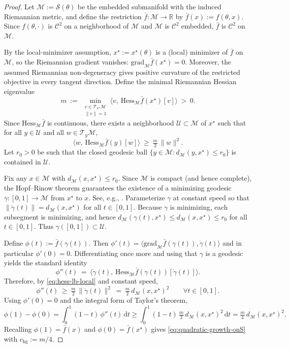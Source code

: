 \documentclass{article}
\theoremstyle{normaltheorem}
\newcommand{\ud}{\mathrm{d}}
\newcommand{\R}{\mathbb{R}}
\newcommand{\calS}{\mathcal{S}}
\begin{document}
\begin{proof}
Let $\mathcal M:=\calS(\theta)$ be the embedded submanifold with the induced Riemannian metric, and define the restriction
$\bar f:\mathcal M\to\R$ by $\bar f(x):=f(\theta,x)$.
Since $f(\theta,\cdot)$ is $\mathcal{C}^{2}$ on a neighborhood of $\mathcal M$ and $\mathcal M$ is $\mathcal{C}^{2}$ embedded,
$\bar f$ is $\mathcal{C}^{2}$ on $\mathcal M$.

By the local-minimizer assumption, $x^\star:=x^\star(\theta)$ is a (local) minimizer of $\bar f$ on $\mathcal M$, so the Riemannian gradient vanishes:
$\mathrm{grad}_{\mathcal M}\bar f(x^\star)=0$.
Moreover, the assumed Riemannian non-degeneracy gives positive curvature of the restricted objective in every tangent direction.
Define the minimal Riemannian Hessian eigenvalue
\[
m
\ :=\
\min_{\substack{v\in\mathcal T_{x^\star}\mathcal M\\ \|v\|=1}}
\big\langle v,\ \mathrm{Hess}_{\mathcal M}\bar f(x^\star)[v]\big\rangle
\ >\ 0.
\]
Since $\mathrm{Hess}_{\mathcal M}\bar f$ is continuous, there exists a neighborhood $\mathcal U\subset\mathcal M$ of $x^\star$
such that for all $y\in\mathcal U$ and all $w\in\mathcal T_y\mathcal M$,
\begin{equation}\label{eq:hess-lb-local}
\big\langle w,\ \mathrm{Hess}_{\mathcal M}\bar f(y)[w]\big\rangle\ \ge\ \tfrac{m}{2}\,\|w\|^2.
\end{equation}
Let $r_0>0$ be such that the closed geodesic ball
\(\{y\in\mathcal M:d_{\mathcal M}(y,x^\star)\le r_0\}\) is contained in $\mathcal U$.

Fix any $x\in\mathcal M$ with $d_{\mathcal M}(x,x^\star)\le r_0$.
Since $\mathcal M$ is compact (and hence complete), the Hopf--Rinow theorem guarantees the existence of a minimizing geodesic
$\gamma:[0,1]\to\mathcal M$ from $x^\star$ to $x$.
See, e.g., \citep[Hopf--Rinow Theorem]{lee2006riemannian}.
Parameterize $\gamma$ at constant speed so that $\|\dot\gamma(t)\|=d_{\mathcal M}(x,x^\star)$ for all $t\in[0,1]$.
Because $\gamma$ is minimizing, each subsegment is minimizing, and hence
\(d_{\mathcal M}(\gamma(t),x^\star)\le d_{\mathcal M}(x,x^\star)\le r_0\) for all \(t\in[0,1]\). Thus
\(\gamma([0,1])\subset\mathcal U\).

Define $\phi(t):=\bar f(\gamma(t))$.
Then $\phi'(t)=\langle \mathrm{grad}_{\mathcal M}\bar f(\gamma(t)),\dot\gamma(t)\rangle$ and in particular $\phi'(0)=0$.
Differentiating once more and using that $\gamma$ is a geodesic yields the standard identity
\[
\phi''(t)
\ =\
\big\langle \dot\gamma(t),\ \mathrm{Hess}_{\mathcal M}\bar f(\gamma(t))[\dot\gamma(t)]\big\rangle.
\]
Therefore, by \eqref{eq:hess-lb-local} and constant speed,
\[
\phi''(t)
\ \ge\
\tfrac{m}{2}\,\|\dot\gamma(t)\|^2
\ =\
\tfrac{m}{2}\,d_{\mathcal M}(x,x^\star)^2
\qquad \forall t\in[0,1].
\]
Using $\phi'(0)=0$ and the integral form of Taylor's theorem,
\[
\phi(1)-\phi(0)
=\int_0^1 (1-t)\,\phi''(t)\,\ud t
\ge \int_0^1 (1-t)\,\tfrac{m}{2}\,d_{\mathcal M}(x,x^\star)^2\,\ud t
=\tfrac{m}{4}\,d_{\mathcal M}(x,x^\star)^2.
\]
Recalling $\phi(1)=\bar f(x)$ and $\phi(0)=\bar f(x^\star)$ gives \eqref{eq:quadratic-growth-onS} with $c_{\mathrm{hg}}:=m/4$.
\end{proof}
\end{document}
